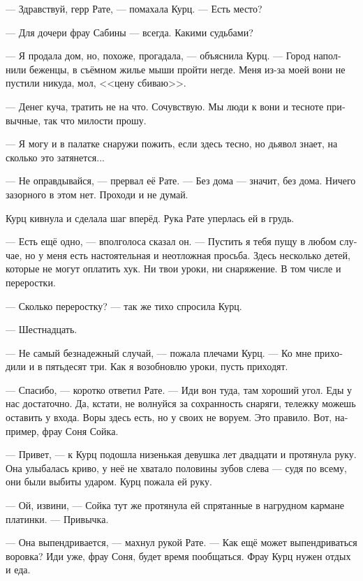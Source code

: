 \documentclass[a4paper,12pt,fleqn]{book}\usepackage{polyglossia}\setdefaultlanguage[babelshorthands=true]{russian}\setotherlanguage{english}\defaultfontfeatures{Ligatures=TeX,Mapping=tex-text}\usepackage{xcolor}\newcommand{\ml}[3]{#2}
\begin{document}
--- Здравствуй, герр Рате, --- помахала Курц.
--- Есть место?

--- Для дочери фрау Сабины --- всегда.
Какими судьбами?

--- Я продала дом, но, похоже, прогадала, --- объяснила Курц.
--- Город наполнили беженцы, в съёмном жилье мыши пройти негде.
Меня из-за моей вони не пустили никуда, мол, <<цену сбиваю>>.

--- Денег куча, тратить не на что.
Сочувствую.
Мы люди к вони и тесноте привычные, так что милости прошу.

--- Я могу и в палатке снаружи пожить, если здесь тесно, но дьявол знает, на сколько это затянется...

--- Не оправдывайся, --- прервал её Рате.
\ml{$0$}
{--- Без дома --- значит, без дома.}
{``You have no home, that means you're homeless.}
\ml{$0$}
{Ничего зазорного в этом нет.}
{It's not a thing to shame.}
Проходи и не думай.

Курц кивнула и сделала шаг вперёд.
Рука Рате уперлась ей в грудь.

--- Есть ещё одно, --- вполголоса сказал он.
--- Пустить я тебя пущу в любом случае, но у меня есть настоятельная и неотложная просьба.
Здесь несколько детей, которые не могут оплатить хук.
Ни твои уроки, ни снаряжение.
В том числе и переростки.

--- Сколько переростку? --- так же тихо спросила Курц.

--- Шестнадцать.

--- Не самый безнадежный случай, --- пожала плечами Курц.
--- Ко мне приходили и в пятьдесят три.
Как я возобновлю уроки, пусть приходят.

--- Спасибо, --- коротко ответил Рате.
--- Иди вон туда, там хороший угол.
Еды у нас достаточно.
Да, кстати, не волнуйся за сохранность снаряги, тележку можешь оставить у входа.
Воры здесь есть, но у своих не воруем.
Это правило.
Вот, например, фрау Соня Сойка.

--- Привет, --- к Курц подошла низенькая девушка лет двадцати и протянула руку.
Она улыбалась криво, у неё не хватало половины зубов слева --- судя по всему, они были выбиты ударом.
Курц пожала ей руку.

--- Ой, извини, --- Сойка тут же протянула ей спрятанные в нагрудном кармане платинки.
--- Привычка.

--- Она выпендривается, --- махнул рукой Рате.
--- Как ещё может выпендриваться воровка?
Иди уже, фрау Соня, будет время пообщаться.
Фрау Курц нужен отдых и еда.
\end{document}
